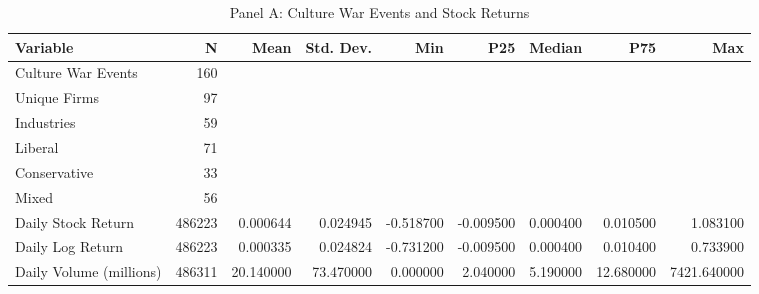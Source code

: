 \begin{table}
\caption{Panel A: Culture War Events and Stock Returns}
\label{tab:panel_a}
\begin{tabular}{lrrrrrrrr}
\hline\hline
Variable & N & Mean & Std. Dev. & Min & P25 & Median & P75 & Max \\
\hline
Culture War Events & 160 &  &  &  &  &  &  &  \\
  Unique Firms & 97 &  &  &  &  &  &  &  \\
  Industries & 59 &  &  &  &  &  &  &  \\
  Liberal & 71 &  &  &  &  &  &  &  \\
  Conservative & 33 &  &  &  &  &  &  &  \\
  Mixed & 56 &  &  &  &  &  &  &  \\
Daily Stock Return & 486223 & 0.000644 & 0.024945 & -0.518700 & -0.009500 & 0.000400 & 0.010500 & 1.083100 \\
Daily Log Return & 486223 & 0.000335 & 0.024824 & -0.731200 & -0.009500 & 0.000400 & 0.010400 & 0.733900 \\
Daily Volume (millions) & 486311 & 20.140000 & 73.470000 & 0.000000 & 2.040000 & 5.190000 & 12.680000 & 7421.640000 \\
\hline\hline
\end{tabular}
\end{table}
